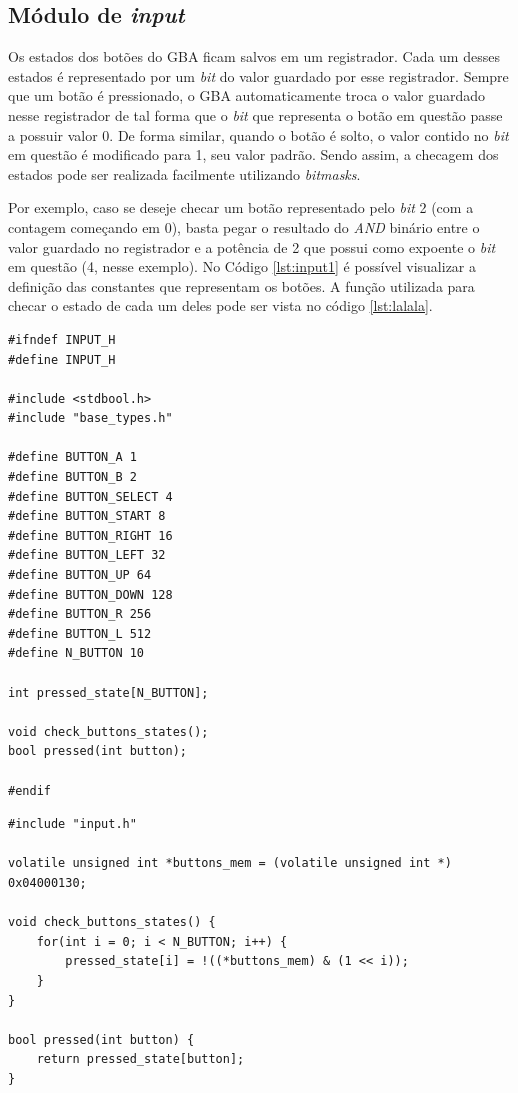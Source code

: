 \subsection{Módulo de \textit{input}}

Os estados dos botões do GBA ficam salvos em um registrador. Cada um desses estados é representado por um \textit{bit} do valor guardado por esse registrador. Sempre que um botão é pressionado, o GBA automaticamente troca o valor guardado nesse registrador de tal forma que o \textit{bit} que representa o botão em questão passe a possuir valor 0. De forma similar, quando o botão é solto, o valor contido no \textit{bit} em questão é modificado para 1, seu valor padrão. Sendo assim, a checagem dos estados pode ser realizada facilmente utilizando \textit{bitmasks}.

Por exemplo, caso se deseje checar um botão representado pelo \textit{bit} 2 (com a contagem começando em 0), basta pegar o resultado do \textit{AND} binário entre o valor guardado no registrador e a potência de 2 que possui como expoente o \textit{bit} em questão (4, nesse exemplo). No Código \ref{lst:input1} é possível visualizar a definição das constantes que representam os botões. A função utilizada para checar o estado de cada um deles pode ser vista no código \ref{lst:lalala}.

\begin{lstlisting}[caption={Cabeçalho do módulo de \textit{input}.},label={lst:input1}]
#ifndef INPUT_H
#define INPUT_H

#include <stdbool.h>
#include "base_types.h"

#define BUTTON_A 1
#define BUTTON_B 2
#define BUTTON_SELECT 4
#define BUTTON_START 8
#define BUTTON_RIGHT 16
#define BUTTON_LEFT 32
#define BUTTON_UP 64
#define BUTTON_DOWN 128
#define BUTTON_R 256
#define BUTTON_L 512
#define N_BUTTON 10

int pressed_state[N_BUTTON];

void check_buttons_states();
bool pressed(int button);

#endif
\end{lstlisting}

\begin{lstlisting}[caption={Código-fonte do módulo de \textit{input}.},label={lst:lalala}]
#include "input.h"

volatile unsigned int *buttons_mem = (volatile unsigned int *) 0x04000130;

void check_buttons_states() {
    for(int i = 0; i < N_BUTTON; i++) {
        pressed_state[i] = !((*buttons_mem) & (1 << i));
    }
}

bool pressed(int button) {
    return pressed_state[button];
}
\end{lstlisting}

